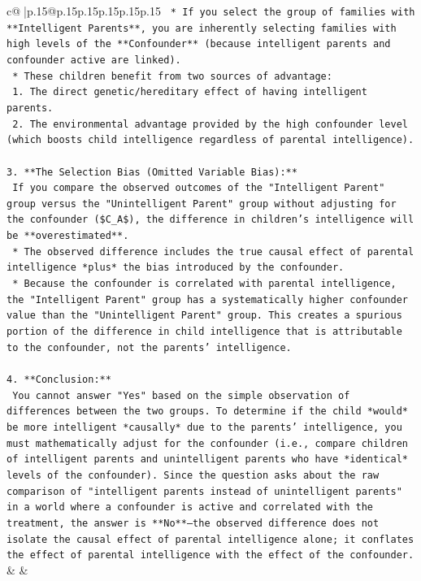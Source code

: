 \documentclass{article}
\begin{document}
{\begin{supertabular}{c@{$\;$}|p{.15\linewidth}@{}p{.15\linewidth}p{.15\linewidth}p{.15\linewidth}p{.15\linewidth}p{.15\linewidth}}
{{{\texttt{    *   If you select the group of families with **Intelligent Parents**, you are inherently selecting families with high levels of the **Confounder** (because intelligent parents and confounder active are linked).} \\
\texttt{    *   These children benefit from two sources of advantage:} \\
\texttt{        1.  The direct genetic/hereditary effect of having intelligent parents.} \\
\texttt{        2.  The environmental advantage provided by the high confounder level (which boosts child intelligence regardless of parental intelligence).} \\
\\ 
\texttt{3.  **The Selection Bias (Omitted Variable Bias):**} \\
\texttt{    If you compare the observed outcomes of the "Intelligent Parent" group versus the "Unintelligent Parent" group without adjusting for the confounder (\$C\_A\$), the difference in children's intelligence will be **overestimated**.} \\
\texttt{    *   The observed difference includes the true causal effect of parental intelligence *plus* the bias introduced by the confounder.} \\
\texttt{    *   Because the confounder is correlated with parental intelligence, the "Intelligent Parent" group has a systematically higher confounder value than the "Unintelligent Parent" group. This creates a spurious portion of the difference in child intelligence that is attributable to the confounder, not the parents' intelligence.} \\
\\ 
\texttt{4.  **Conclusion:**} \\
\texttt{    You cannot answer "Yes" based on the simple observation of differences between the two groups. To determine if the child *would* be more intelligent *causally* due to the parents' intelligence, you must mathematically adjust for the confounder (i.e., compare children of intelligent parents and unintelligent parents who have *identical* levels of the confounder). Since the question asks about the raw comparison of "intelligent parents instead of unintelligent parents" in a world where a confounder is active and correlated with the treatment, the answer is **No**—the observed difference does not isolate the causal effect of parental intelligence alone; it conflates the effect of parental intelligence with the effect of the confounder.} \\
            }
        }
    }
    & & \\ \\


\end{supertabular}}
\end{document}
